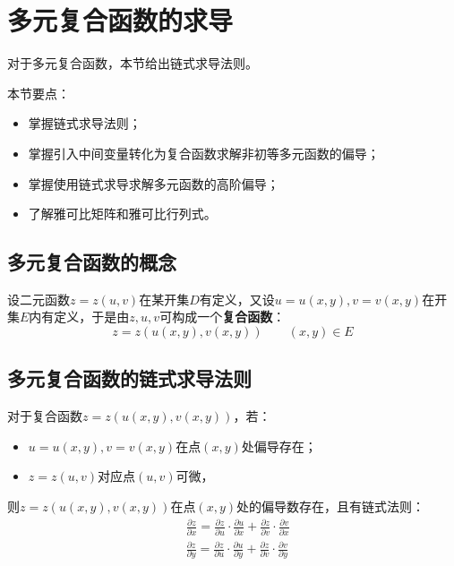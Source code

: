 \section{多元复合函数的求导}

对于多元复合函数，本节给出链式求导法则。

本节要点：
\begin{itemize}
    \item 掌握链式求导法则；
    \item 掌握引入中间变量转化为复合函数求解非初等多元函数的偏导；
    \item 掌握使用链式求导求解多元函数的高阶偏导；
    \item 了解雅可比矩阵和雅可比行列式。
\end{itemize}

\subsection{多元复合函数的概念}

\begin{definition}[复合函数]
设二元函数$z=z\left( u,v \right) $在某开集$D$有定义，又设$u=u\left( x,y \right) ,v=v\left( x,y \right) $在开集$E$内有定义，于是由$z,u,v$可构成一个{\bf 复合函数}：
\[
z=z\left( u\left( x,y \right) ,v\left( x,y \right) \right) \qquad \left( x,y \right) \in E
\]
\end{definition}

\subsection{多元复合函数的链式求导法则}

\begin{theorem}[链式求导法则]
对于复合函数$z=z\left( u\left( x,y \right) ,v\left( x,y \right) \right) $，若：
\begin{itemize}
    \item $u=u\left( x,y \right) ,v=v\left( x,y \right) $在点$\left( x,y \right) $处偏导存在；
    \item $z=z\left( u,v \right) $对应点$\left( u,v \right) $可微，
\end{itemize}
则$z=z\left( u\left( x,y \right) ,v\left( x,y \right) \right) $在点$\left( x,y \right) $处的偏导数存在，且有链式法则：
\begin{align*}
&\frac{\partial z}{\partial x}=\frac{\partial z}{\partial u}\cdot \frac{\partial u}{\partial x}+\frac{\partial z}{\partial v}\cdot \frac{\partial v}{\partial x} \\
&\frac{\partial z}{\partial y}=\frac{\partial z}{\partial u}\cdot \frac{\partial u}{\partial y}+\frac{\partial z}{\partial v}\cdot \frac{\partial v}{\partial y}
\end{align*}
\end{theorem}

